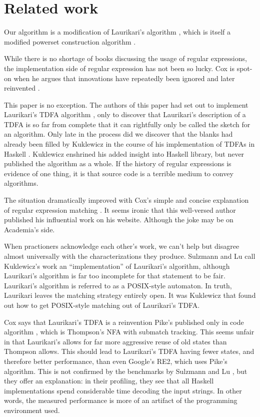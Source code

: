 \documentclass[english]{sigplanconf}
\theoremstyle{definition}
\newcommand{\ra}{$\rightarrow$}
\newcommand{\del}[1]{\textcolor{red}{\sout{#1}}} %
\newcommand{\chg}[2]{\textcolor{red}{\sout{#1}}{\ra}\textcolor{blue}{\uline{#2}}} %
\newcommand{\del}[1]{} %
\newcommand{\chg}[2]{#2}
\renewcommand{\del}[1]{} %
\renewcommand{\chg}[2]{#2} %
\begin{document}
\section{Related work}
Our algorithm is a modification of Laurikari's algorithm \cite{Laur00a},
which is itself a modified powerset construction algorithm \cite[p. 55]{Sips05a}.

While there is no shortage of books discussing the usage of regular
expressions, the implementation side of regular expression has not
been so lucky. Cox is spot-on when he argues that innovations have
repeatedly been ignored and later reinvented \cite{Cox07a,Cox09a,Cox10a}. 

This paper is no exception. The authors of this paper had set out
to implement Laurikari's TDFA algorithm \cite{Laur00a},
only to discover that Laurikari's description of a TDFA is so far
from complete that it can rightfully only be called the sketch for
an algorithm. Only late in the process did we discover that the blanks
had already been filled by Kuklewicz in the course of his implementation
of TDFAs in Haskell \cite{Kukl07a}. Kuklewicz enshrined his
added insight into Haskell library, but never published the algorithm
as a whole. If the history of regular expressions is evidence of one
thing, it is that source code is a terrible medium to convey algorithms. 

The situation dramatically improved with Cox's simple and concise
explanation of regular expression matching \cite{Cox07a}. It seems
ironic that this well-versed author published his influential work
on his website. Although the joke may be on Academia's side.

When \del{the taciturn} practioners acknowledge each other's work, we can't
help but disagree almost universally with the characterizations they
produce. Sulzmann and Lu \cite{Sulz12a} call Kuklewicz's
work an ``implementation'' of Laurikari's algorithm, although Laurikari's
algorithm is far too incomplete for that statement to be fair. Laurikari's
algorithm is referred to as a POSIX-style automaton. In truth, Laurikari
leaves the matching strategy entirely open. It was Kuklewicz that
found out how to get POSIX-style matching out of Laurikari's TDFA. 

Cox says that Laurikari's TDFA is a reinvention Pike's published only
in code algorithm \cite{Pike87a}, which is Thompson's NFA with submatch
tracking. This seems unfair in that Laurikari's allows for far more
aggressive \chg{reusing}{reuse} of old states than \del{what} Thompson allows. This should
lead to Laurikari's TDFA having fewer states, and therefore better
performance, than even Google's RE2, which uses Pike's algorithm.
This is not confirmed by the benchmarks by Sulzmann and Lu \cite{Sulz12a},
but they offer an explanation: in their profiling, they see that all
Haskell implementations spend considerable time decoding the input
strings. In other words, the measured performance is more of an artifact
of the programming environment used. 
\end{document}
